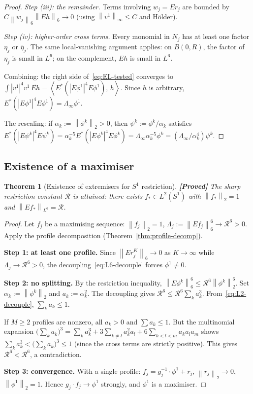 \documentclass[12pt]{article}
\newtheorem{theorem}{Theorem}[section]
\theoremstyle{definition}
\theoremstyle{remark}
\newcommand{\norm}[1]{\left\|#1\right\|}
\newcommand{\ip}[2]{\left\langle #1,\, #2\right\rangle}
\newcommand{\proven}{\textbf{\color{teal}[Proved]}}
\begin{document}
\begin{proof}
  \emph{Step (iii): the remainder.}
  Terms involving $w_j=Er_j$ are bounded by
  $C\norm{w_j}_6^{}\norm{Eh}_6\to 0$ (using
  $\norm{v^1}_\infty\leq C$ and H\"older).

  \emph{Step (iv): higher-order cross terms.}
  Every monomial in $N_j$ has at least one factor $\eta_j$ or
  $\bar\eta_j$.  The same local-vanishing argument applies: on
  $B(0,R)$, the factor of $\eta_j$ is small in $L^6$; on the
  complement, $Eh$ is small in $L^6$.

  \medskip
  Combining: the right side of~\eqref{eq:EL-tested} converges to
  $\int|v^1|^4v^1\,\overline{Eh}
  =\ip{E^*(|E\phi^1|^4E\phi^1)}{h}$.
  Since $h$ is arbitrary,
  $E^*(|E\phi^1|^4E\phi^1)=\Lambda_\infty\phi^1$.

  The rescaling: if $\alpha_k:=\norm{\phi^k}_2>0$, then
  $\psi^k:=\phi^k/\alpha_k$ satisfies
  $E^*(|E\psi^k|^4E\psi^k)
  =\alpha_k^{-5}E^*(|E\phi^k|^4E\phi^k)
  =\Lambda_\infty\alpha_k^{-5}\phi^k
  =(\Lambda_\infty/\alpha_k^4)\psi^k$.
\end{proof}

\subsection{Existence of a maximiser}

\begin{theorem}[Existence of extremisers for $S^1$ restriction]
  \label{thm:maximiser}
  \proven\quad
  The sharp restriction constant $\mathcal R$ is attained: there exists
  $f_*\in L^2(S^1)$ with $\norm{f_*}_2=1$ and
  $\norm{Ef_*}_{L^6}=\mathcal R$.
\end{theorem}

\begin{proof}
  Let $f_j$ be a maximising sequence: $\norm{f_j}_2=1$,
  $\Lambda_j:=\norm{Ef_j}_6^6\to\mathcal R^6>0$.  Apply the profile
  decomposition (Theorem~\ref{thm:profile-decomp}).

  \textbf{Step 1: at least one profile.}
  Since $\norm{Er_j^K}_6\to 0$ as $K\to\infty$ while
  $\Lambda_j\to\mathcal R^6>0$, the
  decoupling~\eqref{eq:L6-decouple} forces $\phi^1\neq 0$.

  \textbf{Step 2: no splitting.}
  By the restriction inequality, $\norm{E\phi^k}_6^6
  \leq\mathcal R^6\norm{\phi^k}_2^6$.  Set $\alpha_k:=\norm{\phi^k}_2$
  and $a_k:=\alpha_k^2$.  The decoupling gives
  $\mathcal R^6\leq\mathcal R^6\sum_{k}a_k^3$.
  From~\eqref{eq:L2-decouple}, $\sum_k a_k\leq 1$.

  If $M\geq 2$ profiles are nonzero, all $a_k>0$ and $\sum a_k\leq 1$.
  But the multinomial expansion
  $\bigl(\sum_k a_k\bigr)^3
  =\sum_k a_k^3+3\sum_{k\neq l}a_k^2a_l+6\sum_{k<l<m}a_ka_la_m$
  shows $\sum_k a_k^3<\bigl(\sum_k a_k\bigr)^3\leq 1$ (since the
  cross terms are strictly positive).  This gives
  $\mathcal R^6<\mathcal R^6$, a contradiction.

  \textbf{Step 3: convergence.}
  With a single profile: $f_j=g_j^{-1}\cdot\phi^1+r_j$,
  $\norm{r_j}_2\to 0$, $\norm{\phi^1}_2=1$.  Hence
  $g_j\cdot f_j\to\phi^1$ strongly, and $\phi^1$ is a maximiser.
\end{proof}
\end{document}
